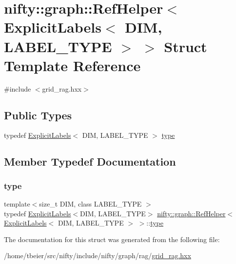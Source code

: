 \hypertarget{structnifty_1_1graph_1_1RefHelper_3_01ExplicitLabels_3_01DIM_00_01LABEL__TYPE_01_4_01_4}{}\section{nifty\+:\+:graph\+:\+:Ref\+Helper$<$ Explicit\+Labels$<$ D\+IM, L\+A\+B\+E\+L\+\_\+\+T\+Y\+PE $>$ $>$ Struct Template Reference}
\label{structnifty_1_1graph_1_1RefHelper_3_01ExplicitLabels_3_01DIM_00_01LABEL__TYPE_01_4_01_4}


{\ttfamily \#include $<$grid\+\_\+rag.\+hxx$>$}

\subsection*{Public Types}
\begin{DoxyCompactItemize}
\item 
typedef \hyperlink{classnifty_1_1graph_1_1ExplicitLabels}{Explicit\+Labels}$<$ D\+IM, L\+A\+B\+E\+L\+\_\+\+T\+Y\+PE $>$ \hyperlink{structnifty_1_1graph_1_1RefHelper_3_01ExplicitLabels_3_01DIM_00_01LABEL__TYPE_01_4_01_4_a806ccbe0ab3e833d470e939f1a8d744d}{type}
\end{DoxyCompactItemize}


\subsection{Member Typedef Documentation}
\mbox{\label{structnifty_1_1graph_1_1RefHelper_3_01ExplicitLabels_3_01DIM_00_01LABEL__TYPE_01_4_01_4_a806ccbe0ab3e833d470e939f1a8d744d}} 
\subsubsection{\texorpdfstring{type}{type}}
{\footnotesize\ttfamily template$<$size\+\_\+t D\+IM, class L\+A\+B\+E\+L\+\_\+\+T\+Y\+PE $>$ \\
typedef \hyperlink{classnifty_1_1graph_1_1ExplicitLabels}{Explicit\+Labels}$<$D\+IM, L\+A\+B\+E\+L\+\_\+\+T\+Y\+PE$>$ \hyperlink{structnifty_1_1graph_1_1RefHelper}{nifty\+::graph\+::\+Ref\+Helper}$<$ \hyperlink{classnifty_1_1graph_1_1ExplicitLabels}{Explicit\+Labels}$<$ D\+IM, L\+A\+B\+E\+L\+\_\+\+T\+Y\+PE $>$ $>$\+::\hyperlink{structnifty_1_1graph_1_1RefHelper_3_01ExplicitLabels_3_01DIM_00_01LABEL__TYPE_01_4_01_4_a806ccbe0ab3e833d470e939f1a8d744d}{type}}



The documentation for this struct was generated from the following file\+:\begin{DoxyCompactItemize}
\item 
/home/tbeier/src/nifty/include/nifty/graph/rag/\hyperlink{grid__rag_8hxx}{grid\+\_\+rag.\+hxx}\end{DoxyCompactItemize}
